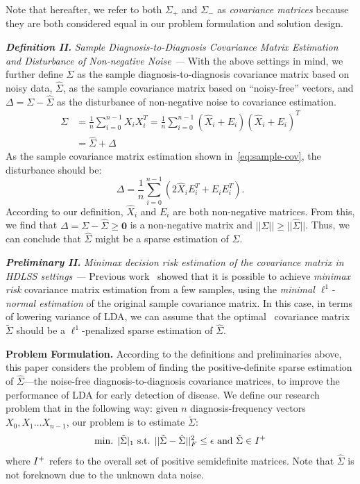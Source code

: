 Note that hereafter, we refer to both $\Sigma_{+}$ and $\Sigma_{-}$ as \emph{covariance matrices} because they are both considered equal in our problem formulation and solution design.


\textbf{\em Definition II.} \emph{Sample Diagnosis-to-Diagnosis Covariance Matrix Estimation and Disturbance of Non-negative Noise --- } With the above settings in mind, we further define $\Sigma$ as the sample diagnosis-to-diagnosis covariance matrix based on noisy data, $\hat{\Sigma}$, as the sample covariance matrix based on ``noisy-free'' vectors, and  $\Delta=\Sigma-\hat{\Sigma}$ as the disturbance of non-negative noise to covariance estimation.
%
\begin{equation}
\begin{aligned}
\Sigma&=\frac{1}{n}\sum_{i=0}^{n-1} X_iX_i^T
=\frac{1}{n}\sum_{i=0}^{n-1} (\hat{X}_i+E_i)(\hat{X}_i+E_i)^T\\
&=\hat{\Sigma}+\Delta
\end{aligned}
\label{eq:sample-cov}
\end{equation}
As the sample covariance matrix estimation shown in~\ref{eq:sample-cov}, the disturbance should be:
%
$$\Delta=\frac{1}{n}\sum_{i=0}^{n-1}(2\hat{X}_iE_i^T+E_iE_i^T).$$ 
%
According to our definition, $\hat{X}_i$ and $E_i$ are both non-negative matrices. 
From this, we find that $\Delta=\Sigma-\hat{\Sigma}\geq \textbf{0}$ is a non-negative matrix and $||\Sigma||\geq ||\hat{\Sigma}||$. 
Thus, we can conclude that $\hat{\Sigma}$ might be a sparse estimation of $\Sigma$. 

\textbf{\em Preliminary II. } \emph{Minimax decision risk estimation of the covariance matrix in HDLSS settings --- } Previous work~\cite{cai2012minimax,xue2012positive} showed that it is possible to achieve \emph{minimax risk} covariance matrix estimation from a few samples, using the \emph{minimal $\ell^1$-normal estimation} of the original sample covariance matrix. 
In this case, in terms of lowering variance of LDA, we can assume that the optimal~\cite{cai2012minimax} covariance matrix $\tilde{\Sigma}$ should be a $\ell^1$-penalized sparse estimation of $\hat{\Sigma}$.

\textbf{Problem Formulation. } According to the definitions and preliminaries above, this paper considers the problem of finding the positive-definite sparse estimation of $\hat{\Sigma}$---the noise-free diagnosis-to-diagnosis covariance matrices, to improve the performance of LDA for early detection of disease. 
We define our research problem that in the following way: given $n$ diagnosis-frequency vectors $X_0,X_1\dots X_{n-1}$,  our problem is to estimate $\tilde{\Sigma}$:
\begin{equation}
\begin{aligned}
\text{min. }|\tilde{\Sigma}|_1 \text{ s.t. }||\tilde{\Sigma}-\hat{\Sigma}||_F^2\leq \epsilon\text{ and }\tilde{\Sigma}\in {\bf }I^+
\end{aligned}
\label{eq:problem}
\end{equation}
where ${\bf }I^+$ refers to the overall set of positive semidefinite matrices. Note that $\hat{\Sigma}$ is not foreknown due to the unknown data noise. 

